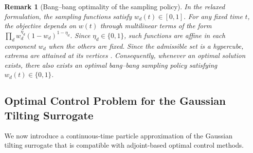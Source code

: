 \documentclass[a4paper,11pt]{article}
\newtheorem{remark}{Remark}
\begin{document}
\begin{remark}[Bang--bang optimality of the sampling policy]
In the relaxed formulation, the sampling functions satisfy $w_d(t)\in[0,1]$.
For any fixed time $t$, the objective depends on $w(t)$ through multilinear
terms of the form $\prod_d w_d^{\eta_d}(1-w_d)^{1-\eta_d}$.
Since $\eta_d \in \{0,1\}$, such functions are affine in each component $w_d$ when the others are fixed.
Since the admissible set is a hypercube, extrema are attained at
its vertices \cite{LANEVE2010}. Consequently, whenever an optimal solution exists, there also
exists an optimal bang--bang sampling policy satisfying $w_d(t)\in\{0,1\}$.
\label{rem:bangbang_sol}
\end{remark}

\subsection{Optimal Control Problem for the Gaussian Tilting Surrogate}


We now introduce a continuous-time particle approximation of the Gaussian
tilting surrogate that is compatible with adjoint-based optimal control methods.
\end{document}
